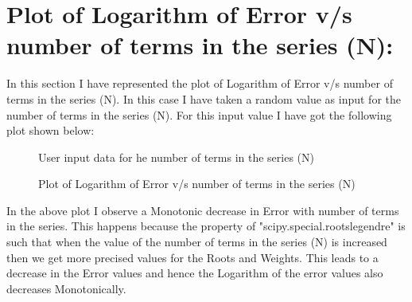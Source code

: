 \documentclass[12pt,a4paper]{article}
\begin{document}
\section{Plot of  Logarithm of Error v/s number of terms in the series (N):}
In this section I have represented the plot of  Logarithm of Error v/s number of terms in the series (N). In this case I have taken a random value as input for the number of terms in the series (N). For this input value I have got the following plot shown below:
\begin{figure}[!ht]
	\begin{center}
	\end{center}
	\caption{User input data for he number of terms in the series (N)}
\end{figure}
\begin{figure}[!ht]
	\begin{center}
	\end{center}
	\caption{Plot of  Logarithm of Error v/s number of terms in the series (N)}
\end{figure}
\clearpage
\noindent
In the above plot I observe a Monotonic decrease in Error with number of terms in the series. This happens because the property of "scipy.special.roots\textunderscore legendre" is such that when the value of the number of terms in the series (N) is increased then we get more precised values for the Roots and Weights. This leads to a decrease in the Error values and hence the Logarithm of the error values also decreases Monotonically.
\end{document}
